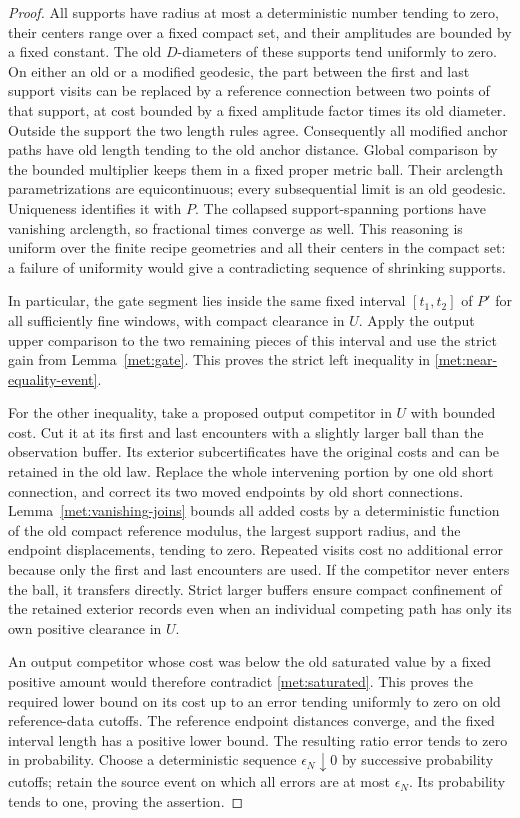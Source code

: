 \documentclass[11pt]{article}
\numberwithin{equation}{section}
\theoremstyle{definition}
\theoremstyle{remark}
\newcommand{\1}{\mathbf 1}
\begin{document}
\begin{proof}
All supports have radius at most a deterministic number tending to
zero, their centers range over a fixed compact set, and their
amplitudes are bounded by a fixed constant.  The old $D$-diameters of
these supports tend uniformly to zero.  On either an old or a
modified geodesic, the part between the first and last support visits
can be replaced by a reference connection between two points of that
support, at cost bounded by a fixed amplitude factor times its old
diameter.  Outside the support the two length rules agree.
Consequently all modified anchor paths have old length tending to the
old anchor distance.  Global comparison by the bounded multiplier
keeps them in a fixed proper metric ball.  Their arclength
parametrizations are equicontinuous; every subsequential limit is an
old geodesic.  Uniqueness identifies it with $P$.  The collapsed
support-spanning portions have vanishing arclength, so fractional
times converge as well.  This reasoning is uniform over the finite
recipe geometries and all their centers in the compact set: a
failure of uniformity would give a contradicting sequence of
shrinking supports.

In particular, the gate segment lies inside the same fixed interval
$[t_1,t_2]$ of $P'$ for all sufficiently fine windows, with compact
clearance in $U$.  Apply the output upper comparison to the two
remaining pieces of this interval and use the strict gain from
Lemma~\ref{met:gate}.  This proves the strict left inequality in
\eqref{met:near-equality-event}.

For the other inequality, take a proposed output competitor in $U$
with bounded cost.  Cut it at its first and last encounters with a
slightly larger ball than the observation buffer.  Its exterior
subcertificates have the original costs and can be retained in the
old law.  Replace the whole intervening portion by one old short
connection, and correct its two moved endpoints by old short
connections.  Lemma~\ref{met:vanishing-joins} bounds all added costs
by a deterministic function of the old compact reference modulus,
the largest support radius, and the endpoint displacements, tending
to zero.  Repeated visits cost no additional error because only the
first and last encounters are used.  If the competitor never enters
the ball, it transfers directly.  Strict larger buffers ensure
compact confinement of the retained exterior records even when an
individual competing path has only its own positive clearance in
$U$.

An output competitor whose cost was below the old saturated value
by a fixed positive amount would therefore contradict
\eqref{met:saturated}.  This proves the required lower bound on its
cost up to an error tending uniformly to zero on old reference-data
cutoffs.  The reference endpoint distances converge, and the fixed
interval length has a positive lower bound.  The resulting ratio
error tends to zero in probability.  Choose a deterministic sequence
$\epsilon_N\downarrow0$ by successive probability cutoffs; retain
the source event on which all errors are at most $\epsilon_N$.
Its probability tends to one, proving the assertion.
\end{proof}
\end{document}
